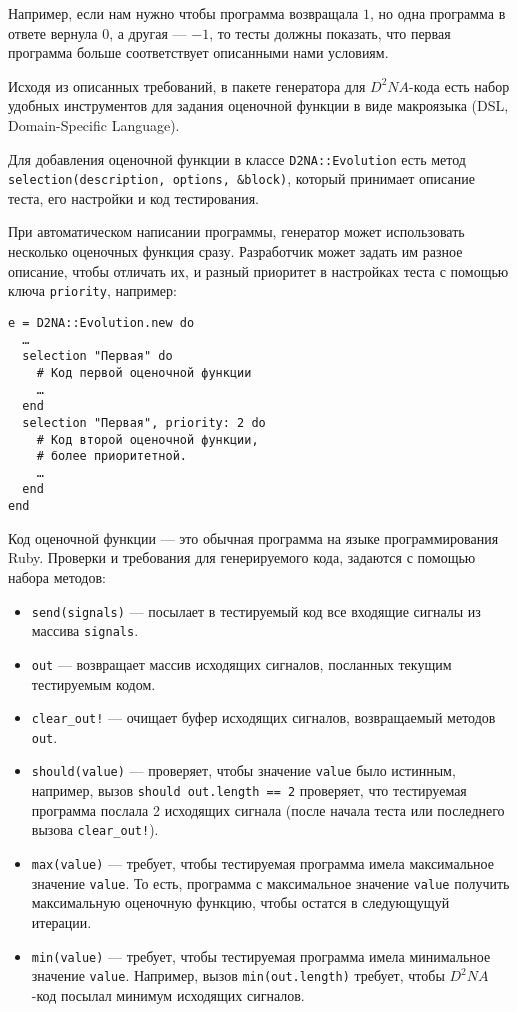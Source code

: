 \documentclass[utf8,a5paper,portrait,12pt]{eskdtext}
\begin{document}
Например, если нам нужно чтобы программа возвращала $1$, но одна программа в
ответе вернула $0$, а другая — $-1$, то тесты должны показать, что первая
программа больше соответствует описанными нами условиям.

Исходя из описанных требований, в пакете генератора для $D^2NA$-кода есть набор
удобных инструментов для задания оценочной функции в виде макроязыка (DSL,
Domain-Specific Language).

Для добавления оценочной функции в классе \texttt{D2NA::Evolution} есть метод
\texttt{selection(description, options, \&block)}, который принимает описание
теста, его настройки и код тестирования.

При автоматическом написании программы, генератор может использовать несколько
оценочных функция сразу. Разработчик может задать им разное описание, чтобы
отличать их, и разный приоритет в настройках теста с помощью ключа
\texttt{priority}, например:

\begin{verbatim}
e = D2NA::Evolution.new do
  …
  selection "Первая" do
    # Код первой оценочной функции
    …
  end
  selection "Первая", priority: 2 do
    # Код второй оценочной функции,
    # более приоритетной.
    …
  end
end
\end{verbatim}

Код оценочной функции — это обычная программа на языке программирования Ruby.
Проверки и требования для генерируемого кода, задаются с помощью набора методов:
\begin{itemize}
  \item \texttt{send(signals)} — посылает в тестируемый код все входящие сигналы
        из массива \texttt{signals}.
  \item \texttt{out} — возвращает массив исходящих сигналов, посланных текущим
        тестируемым кодом.
  \item \texttt{clear\_out!} — очищает буфер исходящих сигналов, возвращаемый
        методов \texttt{out}.
  \item \texttt{should(value)} — проверяет, чтобы значение \texttt{value} было
        истинным, например, вызов \texttt{should out.length == 2} проверяет,
        что тестируемая программа послала 2 исходящих сигнала (после начала
        теста или последнего вызова \texttt{clear\_out!}).
  \item \texttt{max(value)} — требует, чтобы тестируемая программа имела
        максимальное значение \texttt{value}. То есть, программа с максимальное
        значение \texttt{value} получить максимальную оценочную функцию, чтобы
        остатся в следующущуй итерации.
  \item \texttt{min(value)} — требует, чтобы тестируемая программа имела
        минимальное значение \texttt{value}. Например, вызов
        \texttt{min(out.length)} требует, чтобы $D^2NA$-код посылал минимум
        исходящих сигналов.
\end{itemize}
\end{document}
